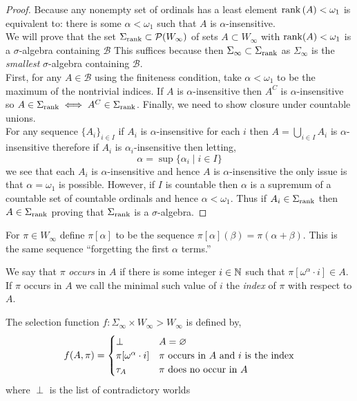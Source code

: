 \documentclass[12pt]{article}
\newcommand{\B}{\mathcal{B}}
\newcommand{\cP}{\mathcal{P}}
\begin{document}
\begin{proof}
Because any nonempty set of ordinals has a least element $\operatorname{\mathrm{rank}}{(A)} < \omega_1$ is equivalent to: there is some $\alpha < \omega_1$ such that $A$ is $\alpha$-insensitive.
\bigskip\\
We will prove that the set $\Sigma_{\rank} \subset \cP(W_{\infty})$ of sets $A \subset W_{\infty}$ with $\operatorname{\mathrm{rank}}(A) < \omega_1$ is a $\sigma$-algebra containing $\B$ This suffices because then $\Sigma_{\infty} \subset \Sigma_{\operatorname{\mathrm{rank}}}$ as $\Sigma_{\infty}$ is the \textit{smallest} $\sigma$-algebra containing $\B$.
\bigskip\\
First, for any $A \in \B$ using the finiteness condition, take $\alpha < \omega_1$ to be the maximum of the nontrivial indices. If $A$ is $\alpha$-insensitive then $A^C$ is $\alpha$-insensitive so $A \in \Sigma_{\operatorname{\mathrm{rank}}} \iff A^C \in \Sigma_{\operatorname{\mathrm{rank}}}$. Finally, we need to show closure under countable unions. 
\bigskip\\
For any sequence $\{ A_i \}_{i \in I}$ if $A_i$ is $\alpha$-insensitive for each $i$ then $A = \bigcup_{i \in I} A_i$ is $\alpha$-insensitive therefore if $A_i$ is $\alpha_i$-insensitive then letting,
\[ \alpha = \sup \{ \alpha_i \mid i \in I \} \]
we see that each $A_i$ is $\alpha$-insensitive and hence $A$ is $\alpha$-insensitive the only issue is that $\alpha = \omega_1$ is possible. However, if $I$ is countable then $\alpha$ is a supremum of a countable set of countable ordinals and hence $\alpha < \omega_1$. Thus if $A_i \in \Sigma_{\operatorname{\mathrm{rank}}}$ then $A \in \Sigma_{\operatorname{\mathrm{rank}}}$ proving that $\Sigma_{\operatorname{\mathrm{rank}}}$ is a $\sigma$-algebra.
\end{proof}

\begin{defn}
For $\pi \in W_{\infty}$ define $\pi[\alpha]$ to be the sequence $\pi[\alpha](\beta) = \pi(\alpha + \beta)$. This is the same sequence ``forgetting the first $\alpha$ terms.'' 
\end{defn}

\begin{defn}
We say that $\pi$ \textit{occurs} in $A$ if there is some integer $i \in \mathbb{N}$ such that $\pi[\omega^\alpha \cdot i] \in A$. If $\pi$ occurs in $A$ we call the minimal such value of $i$ the \textit{index} of $\pi$ with respect to $A$.
\end{defn}

\begin{defn}
The selection function $f : \Sigma_{\infty} \times W_{\infty} > W_{\infty}$ is defined by,
\[ f(A, \pi) = 
\begin{cases}
\perp & A = \varnothing 
\\
\pi[\omega^\alpha \cdot i] & \pi \text{ occurs in } A \text{ and } i \text{ is the index}
\\
\tau_A & \pi \text{ does no occur in } A
\end{cases} \]
where $\perp$ is the list of contradictory worlds 
\end{defn}
\end{document}
